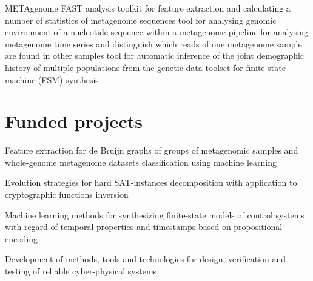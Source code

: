 \documentclass[11pt,a4paper,sans]{moderncv}        %
\begin{document}
        {}{METAgenome FAST analysis toolkit for feature extraction and calculating a number of statistics of metagenome sequences}
        {}{tool for analysing genomic environment of a nucleotide sequence within a metagenome}
        {}{pipeline for analysing metagenome time series and distinguish which reads of one metagenome sample are found in other samples}
        {}{tool for automatic inference of the joint demographic history of multiple populations from the genetic data}
        {}{toolset for finite-state machine (FSM) synthesis}

\section{Funded projects}


        {}{Feature extraction for de Bruijn graphs of groups of metagenomic samples 
           and whole-genome metagenome datasets classification using machine learning}

        {}{Evolution strategies for hard SAT-instances decomposition 
           with application to cryptographic functions inversion}

        {}{Machine learning methods for synthesizing finite-state models of control systems 
           with regard of temporal properties and timestamps based on propositional encoding}

        {}{Development of methods, tools and technologies for design, 
           verification and testing of reliable cyber-physical systems}
\end{document}
